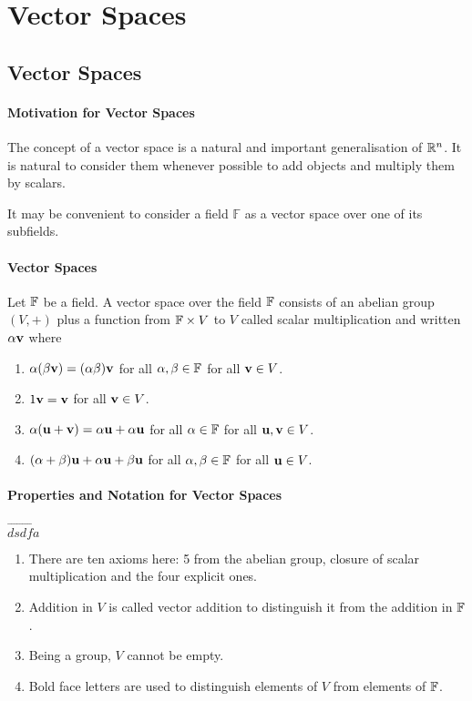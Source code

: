 \section{Vector Spaces}
\subsection{Vector Spaces}

\paragraph{Motivation for Vector Spaces}
The concept of a vector space is a natural and important generalisation of \(\mathbb{R}^n\). It is natural to consider them whenever possible to add objects and multiply them by scalars.

It may be convenient to consider a field \(\mathbb{F}\) as a vector
space over one of its subfields.

\paragraph{Vector Spaces}
Let \(\mathbb{F}\) be a field. A vector space over the field \(\mathbb{F}\) consists of an abelian group \((V, +)\) plus a function from \(\mathbb{F} \times V\) to \(V\) called scalar multiplication and written \(\alpha\mathbf{v}\) where
\begin{enumerate}
    \item \(\alpha(\beta\mathbf{v}) = (\alpha\beta)\mathbf{v}\) for all \(\alpha, \beta \in \mathbb{F}\) for all \(\mathbf{v} \in V\).
    \item \(1\mathbf{v} = \mathbf{v}\) for all \(\mathbf{v} \in V\).
    \item \(\alpha(\mathbf{u} + \mathbf{v}) = \alpha\mathbf{u} + \alpha\mathbf{u}\) for all \(\alpha \in \mathbb{F}\) for all \(\mathbf{u}, \mathbf{v} \in V\).
    \item \((\alpha + \beta)\mathbf{u} + \alpha\mathbf{u} + \beta\mathbf{u}\) for all \(\alpha, \beta \in \mathbb{F}\) for all \(\mathbf{u} \in V\).
\end{enumerate}

\paragraph{Properties and Notation for Vector Spaces}
\(\vec{dsdfa}\)
\begin{enumerate}
    \item There are ten axioms here: 5 from the abelian group, closure of scalar multiplication and the four explicit ones.
    \item Addition in \(V\) is called vector addition to distinguish it from the addition in \(\mathbb{F}\).
    \item Being a group, \(V\) cannot be empty.
    \item Bold face letters are used to distinguish elements of \(V\) from elements of \(\mathbb{F}\).
\end{enumerate}

